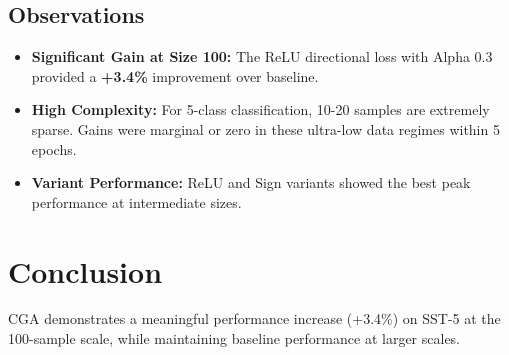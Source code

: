 \documentclass{article}
\begin{document}
\subsection{Observations}
\begin{itemize}
    \item \textbf{Significant Gain at Size 100:} The ReLU directional loss with Alpha 0.3 provided a \textbf{+3.4\%} improvement over baseline.
    \item \textbf{High Complexity:} For 5-class classification, 10-20 samples are extremely sparse. Gains were marginal or zero in these ultra-low data regimes within 5 epochs.
    \item \textbf{Variant Performance:} ReLU and Sign variants showed the best peak performance at intermediate sizes.
\end{itemize}

\section{Conclusion}
CGA demonstrates a meaningful performance increase (+3.4\%) on SST-5 at the 100-sample scale, while maintaining baseline performance at larger scales.
\end{document}
